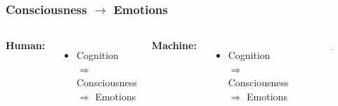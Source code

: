 \documentclass[12pt]{beamer}
\begin{document}

\begin{frame}
\frametitle{Consciousness $\rightarrow$ Emotions}
\begin{columns}[c] %

\textbf{Human:}
\begin{itemize}
\item Cognition $\Rightarrow$ Consciousness $\Rightarrow$ Emotions
\end{itemize}

\textbf{Machine:}
\begin{itemize}
\item Cognition $\Rightarrow$ Consciousness $\Rightarrow$ Emotions
\end{itemize}

\begin{figure}
\includegraphics[width=1.0\linewidth]{Kismet_312}
\end{figure}
\end{columns}
\end{frame}
\end{document}
